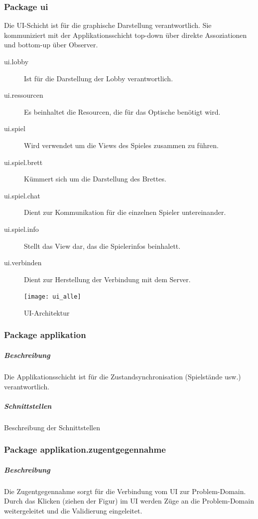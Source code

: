 \documentclass[12pt,halfparskip]{scrartcl}
\begin{document}
\clearpage
\subsubsection{Package ui} %
\label{ssub:package_ui}
Die UI-Schicht ist für die graphische Darstellung verantwortlich. Sie kommuniziert mit der Applikationsschicht top-down über direkte Assoziationen und bottom-up über Observer.

\begin{description}
	\item[ui.lobby] Ist für die Darstellung der Lobby verantwortlich.
	\item[ui.ressourcen] Es beinhaltet die Resourcen, die für das Optische benötigt wird.
	\item[ui.spiel] Wird verwendet um die Views des Spieles zusammen zu führen.
	\item[ui.spiel.brett] Kümmert sich um die Darstellung des Brettes.
	\item[ui.spiel.chat] Dient zur Kommunikation für die einzelnen Spieler untereinander.
	\item[ui.spiel.info] Stellt das View dar, das die Spielerinfos beinhalett.
	\item[ui.verbinden] Dient zur Herstellung der Verbindung mit dem Server.
\end{description}

\begin{figure}[h]
	\centering
	\texttt{[image: ui\_alle]}
	\caption{UI-Architektur}
	\label{fig:ui_alle}
\end{figure}

\clearpage
\subsubsection{Package applikation} %
\label{ssub:package_applikation}
\subparagraph{Beschreibung}
Die Applikationsschicht ist für die Zustandsynchronisation (Spielstände usw.) verantwortlich. 

\subparagraph{Schnittstellen} %
\label{ssub:schnittstellen}
Beschreibung der Schnittstellen

\clearpage
\subsubsection{Package applikation.zugentgegennahme} %
\label{ssub:package_applikation_zugentgegennahme}
\subparagraph{Beschreibung}
\label{ssub:beschreibung}
Die Zugentgegennahme sorgt für die Verbindung vom UI zur Problem-Domain. Durch das Klicken (ziehen der Figur) im UI werden Züge an die Problem-Domain weitergeleitet und die Validierung eingeleitet.
\end{document}
